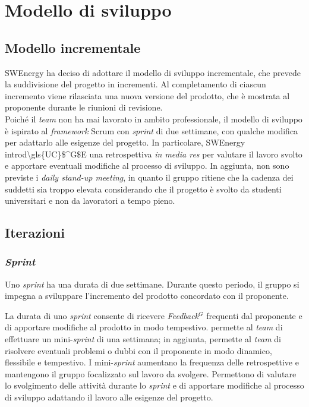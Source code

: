 \section{Modello di sviluppo}

\subsection{Modello incrementale}
SWEnergy ha deciso di adottare il modello di sviluppo incrementale, che prevede
la suddivisione del progetto in incrementi. Al completamento di ciascun
incremento viene rilasciata una nuova versione del prodotto, che è mostrata al
proponente durante le riunioni di revisione.\\
Poiché il \textit{team} non ha mai
lavorato in ambito professionale, il modello di sviluppo è ispirato al
\textit{framework} Scrum con \textit{sprint} di due settimane, con qualche
modifica per adattarlo alle esigenze del progetto. In particolare,
SWEnergy introd\gls{\gls{UC}$^G$E} una retrospettiva \textit{in media res} per valutare il
lavoro svolto e apportare eventuali modifiche al processo di sviluppo.
In aggiunta, non sono previste i \textit{daily stand-up meeting}, in quanto il
gruppo ritiene che la cadenza dei suddetti sia troppo elevata considerando
che il progetto è svolto da studenti universitari e non da lavoratori a tempo
pieno.

\subsection{Iterazioni}

\subsubsection{\textit{Sprint}}
Uno \textit{sprint} ha una durata di due settimane. Durante questo periodo, il
gruppo si impegna a sviluppare l'incremento del prodotto concordato con il
proponente.

La durata di uno \textit{sprint}
consente di ricevere \textit{\gls{Feedback}$^G$} frequenti dal proponente e di apportare
modifiche al prodotto in modo tempestivo.
permette al \textit{team} di effettuare un mini-\textit{sprint} di una
settimana;
in aggiunta, permette al \textit{team} di risolvere eventuali problemi o dubbi
con il proponente in modo dinamico, flessibile e tempestivo.
I mini-\textit{sprint} aumentano la frequenza delle retrospettive e mantengono
il gruppo focalizzato sul lavoro da svolgere. Permettono di valutare lo
svolgimento delle attività durante lo \textit{sprint} e di apportare modifiche
al processo di sviluppo adattando il lavoro alle esigenze del progetto.


